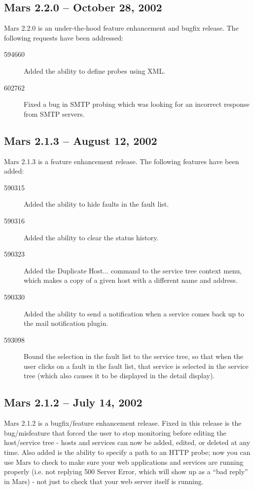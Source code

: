 \documentclass{article}
\begin{document}
\subsection{Mars 2.2.0 -- October 28, 2002}
Mars 2.2.0 is an under-the-hood feature enhancement and bugfix release. The
following requests have been addressed:
\begin{description}
\item[594660] Added the ability to define probes using XML.
\item[602762] Fixed a bug in SMTP probing which was looking for an incorrect
response from SMTP servers.
\end{description}

\subsection{Mars 2.1.3 -- August 12, 2002}
Mars 2.1.3 is a feature enhancement release. The following features have been
added:
\begin{description}
\item[590315] Added the ability to hide faults in the fault list.
\item[590316] Added the ability to clear the status history.
\item[590323] Added the Duplicate Host... command to the service tree context
menu, which makes a copy of a given host with a different name and address.
\item[590330] Added the ability to send a notification when a service comes
back up to the mail notification plugin.
\item[593098] Bound the selection in the fault list to the service tree, so
that when the user clicks on a fault in the fault list, that service is
selected in the service tree (which also causes it to be displayed in the
detail display).
\end{description}

\subsection{Mars 2.1.2 -- July 14, 2002}
Mars 2.1.2 is a bugfix/feature enhancement release.  Fixed in this release is
the bug/misfeature that forced the user to stop monitoring before editing the
host/service tree - hosts and services can now be added, edited, or deleted at
any time. Also added is the ability to specify a path to an HTTP probe; now you
can use Mars to check to make sure your web applications and services are
running properly (i.e. not replying 500 Server Error, which will show up as a
``bad reply'' in Mars) - not just to check that your web server itself is
running.
\end{document}
